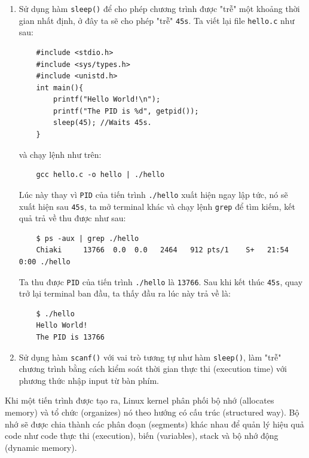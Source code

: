 \documentclass{article}
\begin{document}
\begin{enumerate}
    \item  Sử dụng hàm \verb|sleep()| để cho phép chương trình được "trễ" một khoảng thời gian nhất định, ở đây ta sẽ cho phép "trễ" \verb|45s|. Ta viết lại file \verb|hello.c|
như sau:
\begin{verbatim}
    #include <stdio.h>
    #include <sys/types.h>
    #include <unistd.h>
    int main(){
        printf("Hello World!\n");
        printf("The PID is %d", getpid());
        sleep(45); //Waits 45s.
    }    
\end{verbatim}
và chạy lệnh như trên:
\begin{verbatim}
    gcc hello.c -o hello | ./hello
\end{verbatim}
Lúc này thay vì \verb|PID| của tiến trình \verb|./hello| xuất hiện ngay lập tức, nó sẽ xuất hiện sau \verb|45s|, ta mở terminal khác và chạy lệnh \verb|grep| để tìm kiếm, kết quả trả về thu được như sau:
\begin{verbatim}
    $ ps -aux | grep ./hello
    Chiaki     13766  0.0  0.0   2464   912 pts/1    S+   21:54   0:00 ./hello
\end{verbatim}
Ta thu được \verb|PID| của tiến trình \verb|./hello| là \verb|13766|. Sau khi kết thúc \verb|45s|, quay trở lại terminal ban đầu, ta thấy đầu ra lúc này trả về là:
\begin{verbatim}
    $ ./hello                                                                                              
    Hello World!                                                                                           
    The PID is 13766                                                                                                
\end{verbatim}
    \item Sử dụng hàm \verb|scanf()| với vai trò tương tự như hàm \verb|sleep()|, làm "trễ" chương trình bằng cách kiểm soát thời gian thực thi (execution time) với phương thức nhập input từ bàn phím.
\end{enumerate}
Khi một tiến trình được tạo ra, Linux kernel phân phối bộ nhớ (allocates memory) và tổ chức (organizes) nó theo hướng có cấu trúc (structured way). Bộ nhớ sẽ được chia thành các phân đoạn (segments) khác nhau để quản lý hiệu quả code như code thực thi (execution), biến (variables), stack và bộ nhớ động (dynamic memory).
\end{document}
